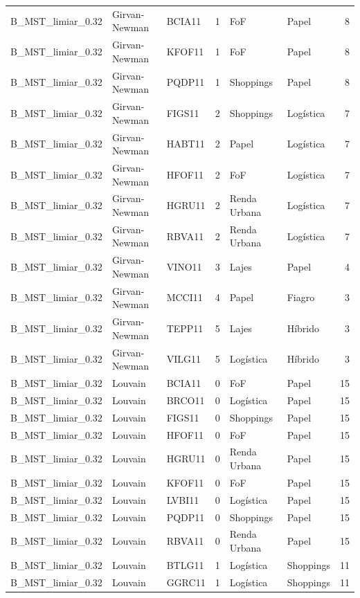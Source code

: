 \begin{tabular}{lllrllr}
B\_MST\_limiar\_0.32 & Girvan-Newman & BCIA11 & 1 & FoF & Papel & 8 \\
B\_MST\_limiar\_0.32 & Girvan-Newman & KFOF11 & 1 & FoF & Papel & 8 \\
B\_MST\_limiar\_0.32 & Girvan-Newman & PQDP11 & 1 & Shoppings & Papel & 8 \\
B\_MST\_limiar\_0.32 & Girvan-Newman & FIGS11 & 2 & Shoppings & Logística & 7 \\
B\_MST\_limiar\_0.32 & Girvan-Newman & HABT11 & 2 & Papel & Logística & 7 \\
B\_MST\_limiar\_0.32 & Girvan-Newman & HFOF11 & 2 & FoF & Logística & 7 \\
B\_MST\_limiar\_0.32 & Girvan-Newman & HGRU11 & 2 & Renda Urbana & Logística & 7 \\
B\_MST\_limiar\_0.32 & Girvan-Newman & RBVA11 & 2 & Renda Urbana & Logística & 7 \\
B\_MST\_limiar\_0.32 & Girvan-Newman & VINO11 & 3 & Lajes & Papel & 4 \\
B\_MST\_limiar\_0.32 & Girvan-Newman & MCCI11 & 4 & Papel & Fiagro & 3 \\
B\_MST\_limiar\_0.32 & Girvan-Newman & TEPP11 & 5 & Lajes & Híbrido & 3 \\
B\_MST\_limiar\_0.32 & Girvan-Newman & VILG11 & 5 & Logística & Híbrido & 3 \\
B\_MST\_limiar\_0.32 & Louvain & BCIA11 & 0 & FoF & Papel & 15 \\
B\_MST\_limiar\_0.32 & Louvain & BRCO11 & 0 & Logística & Papel & 15 \\
B\_MST\_limiar\_0.32 & Louvain & FIGS11 & 0 & Shoppings & Papel & 15 \\
B\_MST\_limiar\_0.32 & Louvain & HFOF11 & 0 & FoF & Papel & 15 \\
B\_MST\_limiar\_0.32 & Louvain & HGRU11 & 0 & Renda Urbana & Papel & 15 \\
B\_MST\_limiar\_0.32 & Louvain & KFOF11 & 0 & FoF & Papel & 15 \\
B\_MST\_limiar\_0.32 & Louvain & LVBI11 & 0 & Logística & Papel & 15 \\
B\_MST\_limiar\_0.32 & Louvain & PQDP11 & 0 & Shoppings & Papel & 15 \\
B\_MST\_limiar\_0.32 & Louvain & RBVA11 & 0 & Renda Urbana & Papel & 15 \\
B\_MST\_limiar\_0.32 & Louvain & BTLG11 & 1 & Logística & Shoppings & 11 \\
B\_MST\_limiar\_0.32 & Louvain & GGRC11 & 1 & Logística & Shoppings & 11 \\

\end{tabular}
